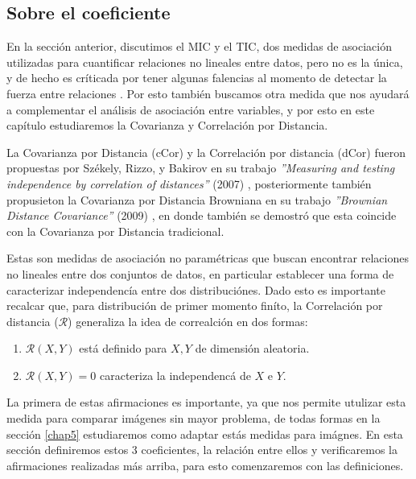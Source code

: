 \subsection{Sobre el coeficiente}

En la secci\'on anterior, discutimos el MIC y el TIC, dos medidas de asociaci\'on utilizadas para cuantificar relaciones no lineales entre datos, pero no es la \'unica, y de hecho es cr\'iticada por tener algunas falencias al momento de detectar la fuerza entre relaciones \cite{SimonTibshirani}. Por esto tambi\'en buscamos otra medida que nos ayudar\'a a complementar el an\'alisis de asociaci\'on entre variables, y por esto en este cap\'itulo estudiaremos la Covarianza y Correlaci\'on por Distancia.

La Covarianza por Distancia (cCor) y la Correlaci\'on por distancia (dCor) fueron propuestas por Sz\'ekely, Rizzo, y Bakirov en su trabajo \textit{''Measuring and testing independence by correlation of distances''} (2007) \cite{Szekely2007}, posteriormente tambi\'en propusieton la Covarianza por Distancia Browniana en su trabajo \textit{''Brownian Distance Covariance''} (2009) \cite{Szekely2009}, en donde tambi\'en se demostr\'o que esta coincide con la Covarianza por Distancia tradicional.

Estas son medidas de asociaci\'on no param\'etricas que buscan encontrar relaciones no lineales entre dos conjuntos de datos, en particular establecer una forma de caracterizar independenc\'ia entre dos distribuci\'ones. Dado esto es importante recalcar que, para distribuci\'on de primer momento fin\'ito, la Correlaci\'on por distancia ($\mathcal{R}$) generaliza la idea de correalci\'on en dos formas:

\begin{enumerate}
	\item $\mathcal{R}(X,Y)$ est\'a definido para $X,Y$ de dimensi\'on aleatoria.
	\item $\mathcal{R}(X,Y) = 0$ caracteriza la independenc\'a de $X$ e $Y$.	 
\end{enumerate}

La primera de estas afirmaciones es importante, ya que nos permite utulizar esta medida para comparar im\'agenes sin mayor problema, de todas formas en la secci\'on \ref{chap5} estudiaremos como adaptar est\'as medidas para im\'agnes. En esta secci\'on definiremos estos 3 coeficientes, la relaci\'on entre ellos y verificaremos la afirmaciones realizadas m\'as arriba, para esto comenzaremos con las definiciones. 

